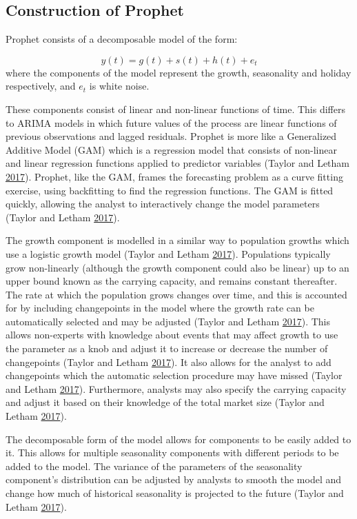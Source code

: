 \documentclass[12pt,preprint, authoryear]{elsarticle}
\numberwithin{equation}{section}
\numberwithin{figure}{section}
\numberwithin{table}{section}
\begin{document}
\subsection{Construction of Prophet}\label{construction-of-prophet}

Prophet consists of a decomposable model of the form:

\[ 
    y(t) = g(t) + s(t) + h(t) + e_t
\] where the components of the model represent the growth, seasonality
and holiday respectively, and \(e_t\) is white noise.

These components consist of linear and non-linear functions of time.
This differs to ARIMA models in which future values of the process are
linear functions of previous observations and lagged residuals. Prophet
is more like a Generalized Additive Model (GAM) which is a regression
model that consists of non-linear and linear regression functions
applied to predictor variables (Taylor and Letham
\protect\hyperlink{ref-taylor2017}{2017}). Prophet, like the GAM, frames
the forecasting problem as a curve fitting exercise, using backfitting
to find the regression functions. The GAM is fitted quickly, allowing
the analyst to interactively change the model parameters (Taylor and
Letham \protect\hyperlink{ref-taylor2017}{2017}).

The growth component is modelled in a similar way to population growths
which use a logistic growth model (Taylor and Letham
\protect\hyperlink{ref-taylor2017}{2017}). Populations typically grow
non-linearly (although the growth component could also be linear) up to
an upper bound known as the carrying capacity, and remains constant
thereafter. The rate at which the population grows changes over time,
and this is accounted for by including changepoints in the model where
the growth rate can be automatically selected and may be adjusted
(Taylor and Letham \protect\hyperlink{ref-taylor2017}{2017}). This
allows non-experts with knowledge about events that may affect growth to
use the parameter as a knob and adjust it to increase or decrease the
number of changepoints (Taylor and Letham
\protect\hyperlink{ref-taylor2017}{2017}). It also allows for the
analyst to add changepoints which the automatic selection procedure may
have missed (Taylor and Letham
\protect\hyperlink{ref-taylor2017}{2017}). Furthermore, analysts may
also specify the carrying capacity and adjust it based on their
knowledge of the total market size (Taylor and Letham
\protect\hyperlink{ref-taylor2017}{2017}).

The decomposable form of the model allows for components to be easily
added to it. This allows for multiple seasonality components with
different periods to be added to the model. The variance of the
parameters of the seasonality component's distribution can be adjusted
by analysts to smooth the model and change how much of historical
seasonality is projected to the future (Taylor and Letham
\protect\hyperlink{ref-taylor2017}{2017}).
\end{document}
